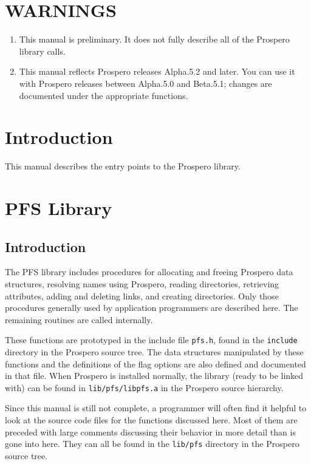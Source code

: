 \tableofcontents

\section{WARNINGS}

\begin{enumerate}
\item This manual is preliminary.  It does not fully describe all of the
Prospero library calls.

\item This manual reflects Prospero releases Alpha.5.2 and later.
You can use it with Prospero releases between Alpha.5.0 and Beta.5.1;
changes are documented under the appropriate functions.

\end{enumerate}

\section{Introduction}

This manual describes the entry points to the Prospero library.

\section{PFS Library}

\subsection{Introduction}

The PFS library includes procedures for allocating and freeing
Prospero data structures, resolving names using Prospero, reading
directories, retrieving attributes, adding and deleting links, and
creating directories.  Only those procedures generally used by application
programmers are described here.  The remaining routines are called
internally.

These functions are prototyped in the include file {\tt pfs.h}, found
in the {\tt include} directory in the Prospero source tree.  The data
structures manipulated by these functions and the definitions of the
flag options are also defined and documented in that file.  When
Prospero is installed normally, the library (ready to be linked with)
can be found in {\tt lib/pfs/libpfs.a} in the Prospero source
hierarchy.

Since this manual is still not complete, a programmer will often find
it helpful to look at the source code files for the functions discussed
here.  Most of them are preceded with large comments discussing their
behavior in more detail than is gone into here.  They can all be found
in the {\tt lib/pfs} directory in the Prospero source tree.

